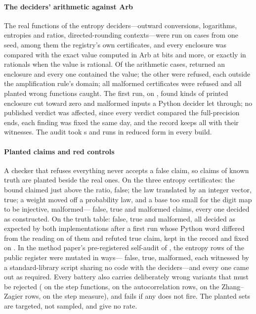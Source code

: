 \documentclass[preprint,11pt,authoryear,a4paper]{elsarticle}
\begin{document}
\paragraph{The deciders' arithmetic against Arb} The real functions of the entropy deciders---outward conversions, logarithms, entropies and ratios, directed-rounding contexts---were run on \MtEaReal{} cases from one seed, among them the registry's own certificates, and every enclosure was compared with the exact value computed in Arb \citep{Johansson17} at \MtEaPrec{} bits and more, or exactly in rationals when the value is rational. Of the \MtEaArith{} arithmetic cases, \MtEaContained{} returned an enclosure and every one contained the value; the other \MtEaRefused{} were refused, each outside the amplification rule's domain; all \MtEaMalformed{} malformed certificates were refused and all \MtEaReds{} planted wrong functions caught. The first run, on \MtEaPinDate, found \MtEaPrintedFindings{} kinds of printed enclosure cut toward zero and \MtEaMalformedFindings{} malformed inputs a Python decider let through; no published verdict was affected, since every verdict compared the full-precision ends, each finding was fixed the same day, and the record keeps all \MtEaFindings{} with their witnesses. The audit took \MtEaSeconds{} s and runs in reduced form in every build.

\paragraph{Planted claims and red controls} A checker that refuses everything never accepts a false claim, so claims of known truth are planted beside the real ones. On the three entropy certificates: the bound claimed just above the ratio, false; the law translated by an integer vector, true; a weight moved off a probability law, and a base too small for the digit map to be injective, malformed---\OcEvFalse{} false, \OcEvTrue{} true and \OcEvMalformed{} malformed claims, every one decided as constructed. On the truth table: \OcFeiPlantedFalse{} false, \OcFeiPlantedTrue{} true and \OcFeiPlantedMalformed{} malformed, all decided as expected by both implementations after a first run whose Python word differed from the reading on \OcFeiFindingsAtPin{} of them and refuted \OcFeiFindingRefutedTrue{} true claim, kept in the record and fixed on \OcFeiFixedDate. In the method paper's pre-registered self-audit of \OcSaDate, the \OcSaRows{} entropy rows of the public register were mutated in \OcSaMutants{} ways---\OcSaFalse{} false, \OcSaTrue{} true, \OcSaMalformed{} malformed, each witnessed by a standard-library script sharing no code with the deciders---and every one came out as required. Every battery also carries deliberately wrong variants that must be rejected (\MtSfReds{} on the step functions, \OcAcReds{} on the autocorrelation rows, \MtCzReds{} on the Zhang--Zagier rows, \OcTraceReds{} on the step measure), and fails if any does not fire. The planted sets are targeted, not sampled, and give no rate.
\end{document}
